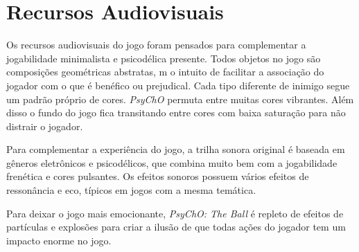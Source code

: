 \section{Recursos Audiovisuais}
\label{sec:audio_visuais}

Os recursos audiovisuais do jogo foram pensados para complementar a jogabilidade minimalista e psicodélica presente. Todos objetos no jogo são composições geométricas abstratas, m o intuito de facilitar a associação do jogador com o que é benéfico ou prejudical. Cada tipo diferente de inimigo segue um padrão próprio de cores. \textit{PsyChO} permuta entre muitas cores vibrantes. Além disso o fundo do jogo fica transitando entre cores com baixa saturação para não distrair o jogador.

Para complementar a experiência do jogo, a trilha sonora original é baseada em gêneros eletrônicos e psicodélicos, que combina muito bem com a jogabilidade frenética e cores pulsantes. Os efeitos sonoros possuem vários efeitos de ressonância e eco, típicos em jogos com a mesma temática.

Para deixar o jogo mais emocionante, \textit{PsyChO: The Ball} é repleto de efeitos de partículas e explosões para criar a ilusão de que todas ações do jogador tem um impacto enorme no jogo.
